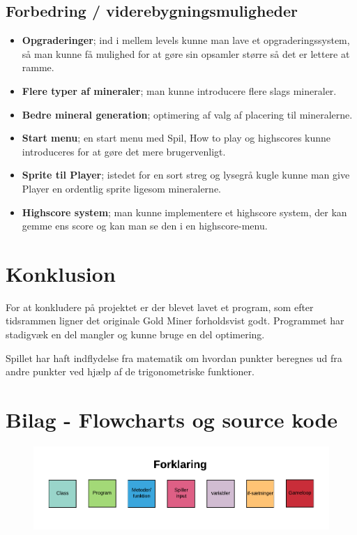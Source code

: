 \documentclass[12pt,a4paper]{article}
\begin{document}
    \subsection*{Forbedring / viderebygningsmuligheder}
        \begin{itemize}
            \item \textbf{Opgraderinger}; ind i mellem levels kunne man lave et opgraderingssystem, så man kunne få mulighed for at gøre sin opsamler større så det er lettere at ramme.
            \item \textbf{Flere typer af mineraler}; man kunne introducere flere slags mineraler.
            \item \textbf{Bedre mineral generation}; optimering af valg af placering til mineralerne.
            \item \textbf{Start menu}; en start menu med Spil, How to play og highscores kunne introduceres for at gøre det mere brugervenligt.
            \item \textbf{Sprite til Player}; istedet for en sort streg og lysegrå kugle kunne man give Player en ordentlig sprite ligesom mineralerne.
            \item \textbf{Highscore system}; man kunne implementere et highscore system, der kan gemme ens score og kan man se den i en highscore-menu. 
        \end{itemize}

\section{Konklusion}
    For at konkludere på projektet er der blevet lavet et program, som efter tidsrammen ligner det originale Gold Miner forholdsvist godt. Programmet har stadigvæk en del mangler og kunne bruge en del optimering. 
    
    Spillet har haft indflydelse fra matematik om hvordan punkter beregnes ud fra andre punkter ved hjælp af de trigonometriske funktioner. 

\newpage

\section{Bilag - Flowcharts og source kode}
    \begin{figure}[H]
        \centering
        \includegraphics[width=\textwidth]{Flowchart - Forklaring}
    \end{figure}

    
    
    
    
    

    
\end{document}
